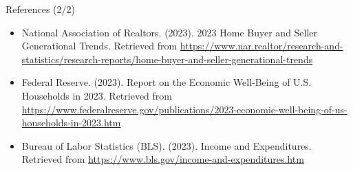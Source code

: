 \documentclass{beamer}
\begin{document}
\begin{frame}{References (2/2)}
    \begin{block}{}
        \begin{itemize}
            \item National Association of Realtors. (2023). 2023 Home Buyer and Seller Generational Trends. Retrieved from \url{https://www.nar.realtor/research-and-statistics/research-reports/home-buyer-and-seller-generational-trends}
            \item Federal Reserve. (2023). Report on the Economic Well-Being of U.S. Households in 2023. Retrieved from \url{https://www.federalreserve.gov/publications/2023-economic-well-being-of-us-households-in-2023.htm}
            \item Bureau of Labor Statistics (BLS). (2023). Income and Expenditures. Retrieved from \url{https://www.bls.gov/income-and-expenditures.htm}
        \end{itemize}
    \end{block}
\end{frame}
\end{document}
